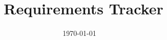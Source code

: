 \documentclass[]{beamer}
\title{\amanzi\ Requirements Tracker}
\author[\href{http://www.lanl.gov/library/find/reports/index.php}{LA-UR-2018xxxx} \qquad \qquad \qquad \qquad \quad \Topa]{\authorTopa}
\institute[CCS-2]{\href{http://www.lanl.gov/org/padste/adtsc/computer-computational-statistical-sciences/computational-physics-methods/index.php}{CCS-2: Computational Physics and Methods} \\ 
\medskip
\textit{dantopa@lanl.gov}
}
\date{\today}
\begin{document}
	\begin{frame}
		\titlepage
	\end{frame}




\end{document}
